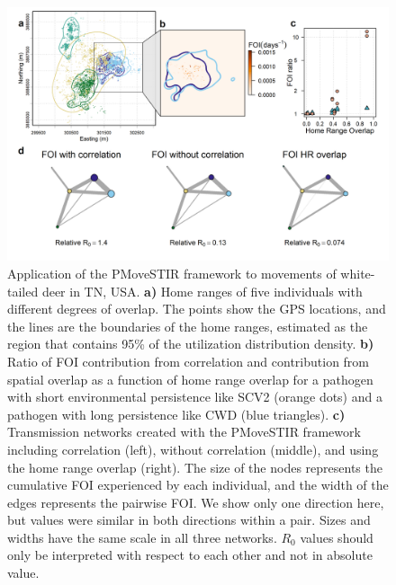 \documentclass[letterpaper]{article}
\begin{document}
\begin{figure}
    \includegraphics[width=\textwidth]{figures/deer_results.png}
    \caption{\small Application of the PMoveSTIR framework to movements of white-tailed deer in TN, USA. \textbf{a)} Home ranges of five individuals with different degrees of overlap. The points show the GPS locations, and the lines are the boundaries of the home ranges, estimated as the region that contains 95\% of the utilization distribution density. %
\textbf{b)} Ratio of FOI contribution from correlation and contribution from spatial overlap as a function of home range overlap for a pathogen with short environmental persistence like SCV2 (orange dots) and a pathogen with long persistence like CWD (blue triangles). \textbf{c)} Transmission networks created with the PMoveSTIR framework including correlation (left), without correlation (middle), and using the home range overlap (right). The size of the nodes represents the cumulative FOI experienced by each individual, and the width of the edges represents the pairwise FOI. We show only one direction here, but values were similar in both directions within a pair. Sizes and widths have the same scale in all three networks. $R_0$ values should only be interpreted with respect to each other and not in absolute value.}
  \label{fig:empiricalres}
\end{figure}
\end{document}
